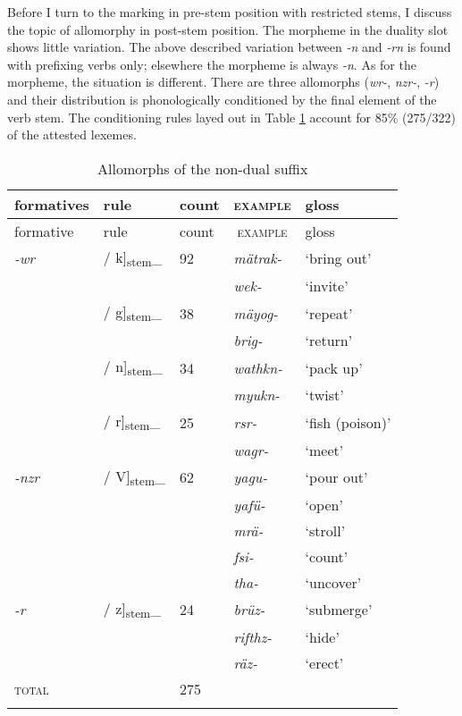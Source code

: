 Before I turn to the  marking in pre-stem position with restricted stems, I discuss the topic of allomorphy in post-stem position. The  morpheme in the duality slot shows little variation. The above described variation between \emph{-n} and \emph{-rn} is found with prefixing verbs only; elsewhere the  morpheme is always \emph{-n}. As for the  morpheme, the situation is different. There are three allomorphs (\emph{wr-}, \emph{nzr-}, \emph{-r}) and their distribution is phonologically conditioned by the final element of the verb stem. The conditioning rules layed out in Table \ref{allonondual} account for 85\% (275/322) of the attested  lexemes.

\begin{table}
	\caption{Allomorphs of the non-dual suffix}
\begin{tabularx}{\textwidth}{lllll}
	\label{allonondual}\\
	\lsptoprule
	{formatives} & {rule} &{count}& \multicolumn{1}{c}{\textsc{example}}& {gloss}\\
	\midrule
	{formative} & {rule} &{count}& \multicolumn{1}{c}{\textsc{example}}& {gloss}\\
	\midrule
	\emph{-wr}& / k]\textsubscript{\tiny{stem}}\_&92& \emph{mätrak-}& `bring out'\\
	&&& \emph{wek-}&`invite'\\
	& / g]\textsubscript{\tiny{stem}}\_	&38& \emph{mäyog-}& `repeat'\\
	&&& \emph{brig-}&`return'\\
	& / n]\textsubscript{\tiny{stem}}\_	&34& \emph{wathkn-}& `pack up'\\
	&&& \emph{myukn-}&`twist'\\
	& / r]\textsubscript{\tiny{stem}}\_	&25& \emph{rsr-}& `fish (poison)'\\
	&&& \emph{wagr-}&`meet'\\\midrule
	\emph{-nzr}	& / V]\textsubscript{\tiny{stem}}\_&62& \emph{yagu-}& `pour out'\\
	&&& \emph{yafü-}& `open'\\
	&&& \emph{mrä-}& `stroll'\\
	&&& \emph{fsi-}& `count'\\
	&&& \emph{tha-}& `uncover'\\\midrule
	\emph{-r}& / z]\textsubscript{\tiny{stem}}\_&24& \emph{brüz-}& `submerge'\\
	&&& \emph{rifthz-}& `hide'\\
	&&& \emph{räz-}& `erect'\\\midrule
	\textsc{total}&&275&&\\
	\lspbottomrule
\end{tabularx}%
\end{table}


